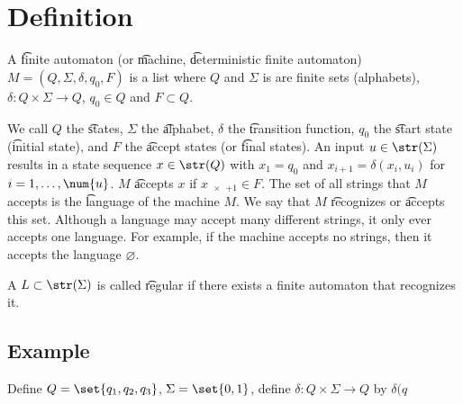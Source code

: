 
\section*{Definition}

A \t{finite automaton} (or \t{machine}, \t{deterministic finite automaton}) $M = (Q, \Sigma , \delta , q_0, F)$ is a list where $Q$ and $\Sigma $ is are finite sets (alphabets), $\delta : Q \times  \Sigma  \to Q$, $q_0 \in Q$ and $F \subset Q$.

We call $Q$ the \t{states}, $\Sigma $ the \t{alphabet}, $\delta $ the \t{transition function}, $q_0$ the \t{start state} (\t{initial state}), and $F$ the \t{accept states} (or \t{final states}).
An input $u \in \str(\Sigma )$ results in a state sequence $x \in \str(Q)$ with $x_1 = q_0$ and $x_{i+1} = \delta (x_i, u_i)$ for $i = 1, \dots , \num{u}$.
$M$ \t{accepts} $x$ if $x_{\num{x}+1} \in F$.
The set of all strings that $M$ accepts is the \t{language} of the machine $M$.
We say that $M$ \t{recognizes} or \t{accepts} this set.
Although a language may accept many different strings, it only ever accepts one language.
For example, if the machine accepts no strings, then it accepts the language $\varnothing$.

A $L \subset \str(\Sigma )$ is called \t{regular} if there exists a finite automaton that recognizes it.

\subsection*{Example}

Define $Q = \set{q_1, q_2, q_3}$, $\Sigma  = \set{0, 1}$, define $\delta : Q \times  \Sigma  \to Q$ by $\delta (q$

\blankpage
